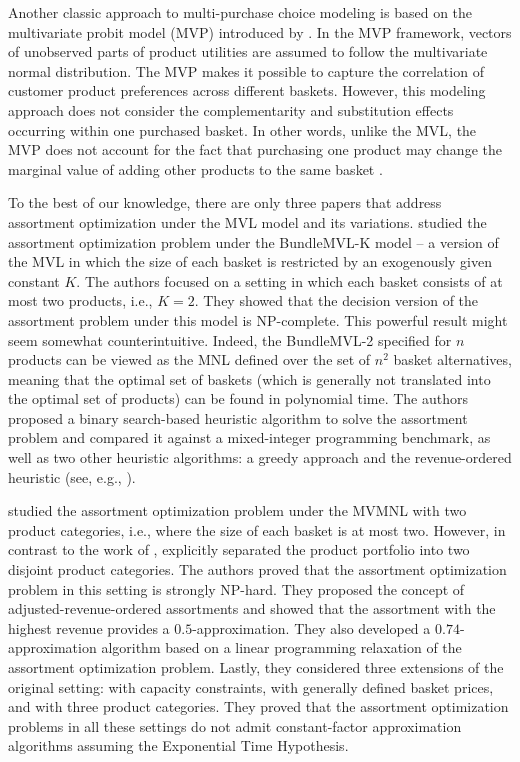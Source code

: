 Another classic approach to multi-purchase choice modeling is based on the multivariate probit model (MVP) introduced by \cite{Manchanda1}. In the MVP framework, vectors of unobserved parts of product utilities are assumed to follow the multivariate normal distribution. 
The MVP makes it possible to capture the correlation of customer product preferences across different baskets. However, this modeling approach does not consider the complementarity and substitution effects occurring within one purchased basket. In other words, unlike the MVL, the MVP does not account for the fact that purchasing one product may change the marginal value of adding other products to the same basket \citep{Kamakura1}. 




To the best of our knowledge, there are only three papers that address assortment optimization under the MVL model and its variations. \cite{Tulabandhula1} studied the assortment optimization problem under the BundleMVL-K model -- a version of the MVL in which the size of each basket is restricted by an exogenously given constant $K$. The authors focused on a setting in which each basket consists of at most two products, i.e., $K=2$. They showed that the decision version of the assortment problem under this model is NP-complete. This powerful result might seem somewhat counterintuitive. Indeed, the BundleMVL-2 specified for $n$ products can be viewed as the MNL defined over the set of $n^2$ basket alternatives, meaning that the optimal set of baskets (which is generally not translated into the optimal set of products) can be found in polynomial time. The authors proposed a binary search-based heuristic algorithm to solve the assortment problem and compared it against a mixed-integer programming benchmark, as well as two other heuristic algorithms: a greedy approach and the revenue-ordered heuristic (see, e.g., \citealp{Rusmevichientong1}). 
 
 \cite{Chen1} studied the assortment optimization problem under the MVMNL with two product categories, i.e., where the size of each basket is at most two. However, in contrast to the work of \cite{Tulabandhula1}, \cite{Chen1} explicitly separated the product portfolio into two disjoint product categories. The authors proved that the assortment optimization problem in this setting is strongly NP-hard. They proposed the concept of adjusted-revenue-ordered assortments and showed that the assortment with the highest revenue provides a $0.5$-approximation. 
They also developed a $0.74$-approximation algorithm based on a linear programming relaxation of the assortment optimization problem. Lastly, they considered three extensions of the original setting: with capacity constraints, with generally defined basket prices, and with three product categories. They proved that the assortment optimization problems in all these settings do not admit constant-factor approximation algorithms assuming the Exponential Time Hypothesis.

